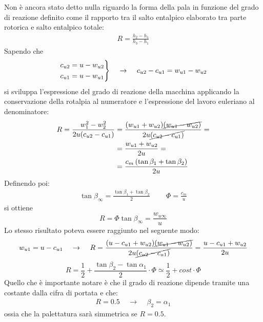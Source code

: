 Non è ancora stato detto nulla riguardo la forma della pala in funzione del grado di reazione definito come il rapporto tra il salto entalpico elaborato tra parte rotorica e salto entalpico totale:
\begin{align*}
R = \frac{h_2 - h_1}{h_3-h_1} 
\end{align*}
Sapendo che
\begin{align*}
\begin{rcases*}
c_{u2} = u - w_{u2}\\
c_{u1} = u - w_{u1}
\end{rcases*}
\;\;\;\; \rightarrow \;\;\;\; c_{u2} - c_{u1} = w_{u1} - w_{u2} 
\end{align*}
si sviluppa l'espressione del grado di reazione della macchina applicando la conservazione della rotalpia al numeratore e l'espressione del lavoro euleriano al denominatore:
\begin{align*}
R = \frac{w_1^2 - w_2^2}{2 u (c_{u2} - c_{u1})} &= \frac{(w_{u1} + w_{u2})\cancel{(w_{u1}-w_{u2})}}{2 u \cancel{(c_{u2} - c_{u1})}} =\\
&= \frac{w_{u1} + w_{u2}}{2u} = \\
&= \frac{c_m \left(\tan \beta_1 + \tan \beta_2 \right)}{2 u}
\end{align*}
Definendo poi:
	\begin{align*}
	\tan \beta_{\infty} = \frac{\tan \beta_1 + \tan \beta_2}{2} \;\;\;\;\;\;\;\; \Phi = \frac{c_m}{u}
	\end{align*}
si ottiene
\begin{equation}
\boxed{R = \Phi \tan \beta_{\infty} = \frac{w_{u \infty}}{u}}
\end{equation}
Lo stesso risultato poteva essere raggiunto nel seguente modo:
\begin{align*}
	w_{u1} = u - c_{u1} \;\;\;\; \rightarrow \;\;\;\; R =\frac{(u-c_{u1}+w_{u2})\cancel{(w_{u1}-w_{u2})}}{2 u \cancel{(c_{u2} - c_{u1})}}=\frac{u-c_{u1}+w_{u2}}{2u}
\end{align*}
\begin{equation}
R = \frac{1}{2} + \frac{\tan \beta_2 - \tan \alpha_1}{2} \cdot \Phi \simeq \frac{1}{2} + cost \cdot \Phi
\end{equation}
Quello che è importante notare è che il grado di reazione dipende tramite una costante dalla cifra di portata e che:
\begin{align*}
R = 0.5 \;\;\;\; \to \;\;\;\; \beta_2 = \alpha_1
\end{align*}
ossia che la palettatura sarà simmetrica se $R=0.5$.

